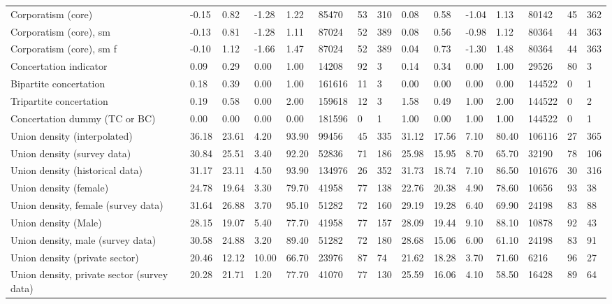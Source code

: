 \begin{longtable}{lllllllllllllll}
Corporatism (core) & -0.15 & 0.82 & -1.28 & 1.22 & 85470 & 53 & 310 & 0.08 & 0.58 & -1.04 & 1.13 & 80142 & 45 & 362\\
\addlinespace
Corporatism (core), sm & -0.13 & 0.81 & -1.28 & 1.11 & 87024 & 52 & 389 & 0.08 & 0.56 & -0.98 & 1.12 & 80364 & 44 & 363\\
Corporatism (core), sm f & -0.10 & 1.12 & -1.66 & 1.47 & 87024 & 52 & 389 & 0.04 & 0.73 & -1.30 & 1.48 & 80364 & 44 & 363\\
Concertation indicator & 0.09 & 0.29 & 0.00 & 1.00 & 14208 & 92 & 3 & 0.14 & 0.34 & 0.00 & 1.00 & 29526 & 80 & 3\\
Bipartite concertation & 0.18 & 0.39 & 0.00 & 1.00 & 161616 & 11 & 3 & 0.00 & 0.00 & 0.00 & 0.00 & 144522 & 0 & 1\\
Tripartite concertation & 0.19 & 0.58 & 0.00 & 2.00 & 159618 & 12 & 3 & 1.58 & 0.49 & 1.00 & 2.00 & 144522 & 0 & 2\\
\addlinespace
Concertation dummy (TC or BC) & 0.00 & 0.00 & 0.00 & 0.00 & 181596 & 0 & 1 & 1.00 & 0.00 & 1.00 & 1.00 & 144522 & 0 & 1\\
Union density (interpolated) & 36.18 & 23.61 & 4.20 & 93.90 & 99456 & 45 & 335 & 31.12 & 17.56 & 7.10 & 80.40 & 106116 & 27 & 365\\
Union density (survey data) & 30.84 & 25.51 & 3.40 & 92.20 & 52836 & 71 & 186 & 25.98 & 15.95 & 8.70 & 65.70 & 32190 & 78 & 106\\
Union density (historical data) & 31.17 & 23.11 & 4.50 & 93.90 & 134976 & 26 & 352 & 31.73 & 18.74 & 7.10 & 86.50 & 101676 & 30 & 316\\
Union density (female) & 24.78 & 19.64 & 3.30 & 79.70 & 41958 & 77 & 138 & 22.76 & 20.38 & 4.90 & 78.60 & 10656 & 93 & 38\\
\addlinespace
Union density, female (survey data) & 31.64 & 26.88 & 3.70 & 95.10 & 51282 & 72 & 160 & 29.19 & 19.28 & 6.40 & 69.90 & 24198 & 83 & 88\\
Union density (Male) & 28.15 & 19.07 & 5.40 & 77.70 & 41958 & 77 & 157 & 28.09 & 19.44 & 9.10 & 88.10 & 10878 & 92 & 43\\
Union density, male (survey data) & 30.58 & 24.88 & 3.20 & 89.40 & 51282 & 72 & 180 & 28.68 & 15.06 & 6.00 & 61.10 & 24198 & 83 & 91\\
Union density (private sector) & 20.46 & 12.12 & 10.00 & 66.70 & 23976 & 87 & 74 & 21.62 & 18.28 & 3.70 & 71.60 & 6216 & 96 & 27\\
Union density, private sector (survey data) & 20.28 & 21.71 & 1.20 & 77.70 & 41070 & 77 & 130 & 25.59 & 16.06 & 4.10 & 58.50 & 16428 & 89 & 64\\

\end{longtable}
